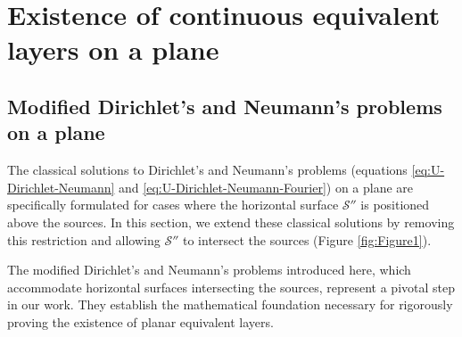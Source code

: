 \section{Existence of continuous equivalent layers on a plane}
\label{sec:planar_eqlayer_theorem}

\subsection{Modified Dirichlet's and Neumann's problems on a plane}

The classical solutions to Dirichlet’s and Neumann’s problems (equations \ref{eq:U-Dirichlet-Neumann} 
and \ref{eq:U-Dirichlet-Neumann-Fourier}) on a plane are specifically formulated for cases where 
the horizontal surface $\mathcal{S}''$ is positioned above the sources. In this section, we extend 
these classical solutions by removing this restriction and allowing $\mathcal{S}''$ to intersect 
the sources (Figure \ref{fig:Figure1}).

The modified Dirichlet’s and Neumann’s problems introduced here, 
which accommodate horizontal surfaces intersecting the sources, represent a pivotal step in our work. 
They establish the mathematical foundation necessary for rigorously proving the existence of planar equivalent layers.
 
